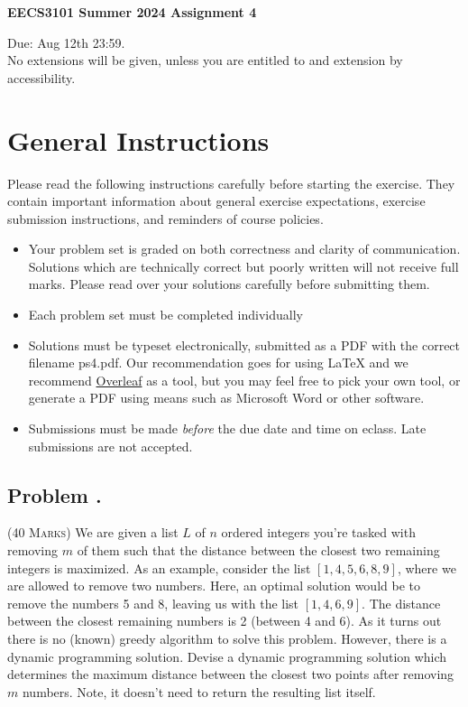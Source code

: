 \documentclass[12pt]{article}
\newcounter{ProblemNum}
\renewcommand{\theProblemNum}{\arabic{ProblemNum}}
\newcommand*{\anyproblem}[1]{\newpage\subsection*{#1}}
\newcommand*{\problem}[1]{\stepcounter{ProblemNum} %
\anyproblem{Problem \theProblemNum. \; #1}}
\begin{document}
\begin{center}
\begin{Large}
  \textbf{EECS3101 Summer 2024 Assignment 4 }\\
\end{Large}
\begin{large}
	Due: Aug 12th 23:59. \\ No extensions will be given, unless you are entitled to and extension by accessibility.
\end{large}
\end{center}

\section*{General Instructions}
Please read the following instructions carefully before starting the exercise. They contain important
information about general exercise expectations, exercise submission instructions,
and reminders of course policies.

\begin{itemize}
\item Your problem set is graded on both correctness and clarity of communication. Solutions
which are technically correct but poorly written will not receive full marks. Please read over
your solutions carefully before submitting them.

\item Each problem set must be completed individually

\item Solutions must be typeset electronically, submitted as a PDF with the correct filename ps4.pdf. Our recommendation goes for using {\LaTeX}  and we recommend \href{https://www.overleaf.com/}{Overleaf} as a tool, but you may feel free to pick your own tool, or generate a PDF using means such as Microsoft Word or other software.


\item Submissions must be made \emph{before} the due date and time on eclass. Late submissions are not accepted.

\end{itemize}



\problem{}
\textsc{(40 Marks)} We are given a list $L$ of $n$ ordered integers you're tasked with removing $m$ of them such that the distance between the closest two remaining integers is maximized.  As an example, consider the list $[1,4,5,6,8,9]$, where we are allowed to remove two numbers. Here, an optimal solution would be to remove the numbers  5 and 8, leaving us with the list $[1,4,6,9]$. The distance between the closest remaining numbers is 2 (between 4 and 6). As it turns out there is no (known) greedy algorithm to solve this problem. However, there is a dynamic programming solution. Devise a dynamic programming solution which determines the maximum distance between the closest two points after removing $m$ numbers. Note, it doesn't need to return the resulting list itself.
\end{document}
